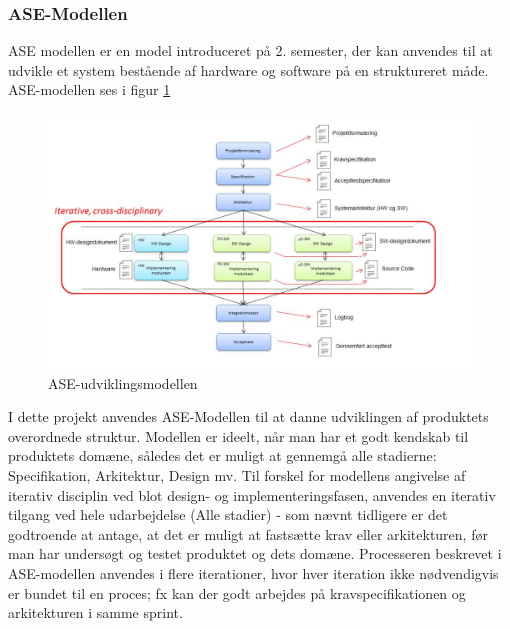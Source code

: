 \documentclass[a4paper,12pt,fleqn,oneside]{article}
\begin{document}
\subsubsection{ASE-Modellen}
ASE modellen er en model introduceret på 2. semester, der kan anvendes til at udvikle et system bestående af hardware og software på en struktureret måde. ASE-modellen ses i figur \ref{fig:ASE}
\begin{figure}[H]
    \centering
    \includegraphics[width=\textwidth]{ProcesDokument/graphics/ASE-Modellen.jpg}
    \caption{ASE-udviklingsmodellen}
    \label{fig:ASE}
\end{figure}
I dette projekt anvendes ASE-Modellen til at danne udviklingen af produktets overordnede struktur. Modellen er ideelt, når man har et godt kendskab til produktets domæne, således det er muligt at gennemgå alle stadierne: Specifikation, Arkitektur, Design mv. Til forskel for modellens angivelse af iterativ disciplin ved blot design- og implementeringsfasen, anvendes en iterativ tilgang ved hele udarbejdelse (Alle stadier) - som nævnt tidligere er det godtroende at antage, at det er muligt at fastsætte krav eller arkitekturen, før man har undersøgt og testet produktet og dets domæne. Processeren beskrevet i ASE-modellen anvendes i flere iterationer, hvor hver iteration ikke nødvendigvis er bundet til en proces; fx kan der godt arbejdes på kravspecifikationen og arkitekturen i samme sprint. 
\end{document}
